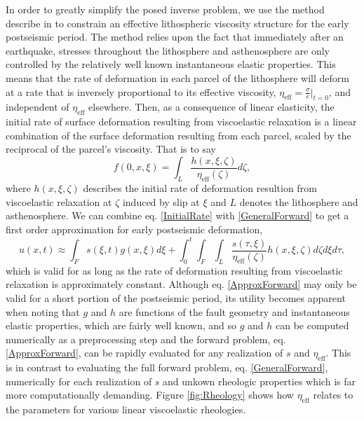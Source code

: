 \documentclass[1p]{elsarticle}
\begin{document}
In order to greatly simplify the posed inverse problem, we use the method describe in \cite{Hines2015} to constrain an effective lithospheric viscosity structure for the early postseismic period.  The method relies upon the fact that immediately after an earthquake, stresses throughout the lithosphere and asthenosphere are only controlled by the relatively well known instantaneous elastic properties.  This means that the rate of deformation in each parcel of the lithosphere will deform at a rate that is inversely proportional to its effective viscosity, $\eta_{\mathrm{eff}}=\frac{\sigma}{\dot{\epsilon}}|_{t=0}$, and independent of $\eta_{\mathrm{eff}}$ elsewhere. Then, as a consequence of linear elasticity, the initial rate of surface deformation resulting from viscoelastic relaxation is a linear combination of the surface deformation resulting from each parcel, scaled by the reciprocal of the parcel's viscosity. That is to say   
\begin{equation}\label{InitialRate}
  f(0,x,\xi) = \int_L \frac{h(x,\xi,\zeta)}{\eta_\mathrm{eff}(\zeta)} d\zeta, 
\end{equation}
where $h(x,\xi,\zeta)$ describes the initial rate of deformation resultion from viscoelastic relaxation at $\zeta$ induced by slip at $\xi$ and $L$ denotes the lithosphere and asthenosphere. We can combine eq. \ref{InitialRate} with \ref{GeneralForward} to get a first order approximation for early postseismic deformation,
\begin{equation}\label{ApproxForward}
  u(x,t) \approx \int_F s(\xi,t)g(x,\xi)d\xi + 
           \int_0^t\int_F\int_L \frac{s(\tau,\xi)}{\eta_\mathrm{eff}(\zeta)} h(x,\xi,\zeta) d\zeta d\xi d\tau,
\end{equation}
which is valid for as long as the rate of deformation resulting from viscoelastic relaxation is approximately constant. Although eq. \ref{ApproxForward} may only be valid for a short portion of the postseismic period, its utility becomes apparent when noting that $g$ and $h$ are functions of the fault geometry and instantaneous elastic properties, which are fairly well known, and so $g$ and $h$ can be computed numerically as a preprocessing step and the forward problem, eq. \ref{ApproxForward}, can be rapidly evaluated for any realization of $s$ and $\eta_{\mathrm{eff}}$.  This is in contrast to evaluating the full forward problem, eq. \ref{GeneralForward}, numerically for each realization of $s$ and unkown rheologic properties which is far more computationally demanding. Figure \ref{fig:Rheology} shows how $\eta_\mathrm{eff}$ relates to the parameters for various linear viscoelastic rheologies.    
\end{document}
